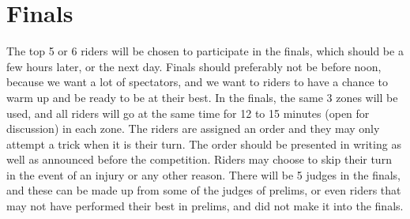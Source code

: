 \section{Finals}
The top 5 or 6 riders will be chosen to participate in the finals, which should be a few hours later, or the next day.
Finals should preferably not be before noon, because we want a lot of spectators, and we want to riders to have a chance to warm up and be ready to be at their best.
In the finals, the same 3 zones will be used, and all riders will go at the same time for 12 to 15 minutes (open for discussion) in each zone.
The riders are assigned an order and they may only attempt a trick when it is their turn.
The order should be presented in writing as well as announced before the competition.
Riders may choose to skip their turn in the event of an injury or any other reason.
There will be 5 judges in the finals, and these can be made up from some of the judges of prelims, or even riders that may not have performed their best in prelims, and did not make it into the finals.
